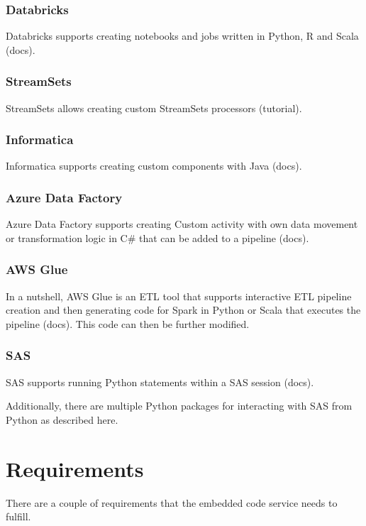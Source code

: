 \subsubsection{Databricks}
Databricks supports creating notebooks and jobs written in Python, R and Scala (docs).

\subsubsection{StreamSets}
StreamSets allows creating custom StreamSets processors (tutorial).

\subsubsection{Informatica}
Informatica supports creating custom components with Java (docs).

\subsubsection{Azure Data Factory}
Azure Data Factory supports creating Custom activity with own data movement or transformation logic in C\# that can be added to a pipeline (docs).

\subsubsection{AWS Glue}
In a nutshell, AWS Glue is an ETL tool that supports interactive ETL pipeline creation and then generating code for Spark in Python or Scala that executes the pipeline (docs). This code can then be further modified.

\subsubsection{SAS}
SAS supports running Python statements within a SAS session (docs).

Additionally, there are multiple Python packages for interacting with SAS from Python as described here.

\section{Requirements}

There are a couple of requirements that the embedded code service needs to fulfill. 

